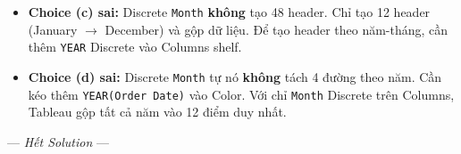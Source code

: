 \documentclass[12pt]{article}
\begin{document}
\begin{enumerate}[label=\textbf{Câu \arabic*.}, leftmargin=*, labelsep=1em, itemsep=2em]
\begin{guidelinebox}
\begin{itemize}
    \item \textbf{Choice (c) sai:} Discrete \texttt{Month} \textbf{không} tạo 48 header. Chỉ tạo 12 header (January $\rightarrow$ December) và gộp dữ liệu. Để tạo header theo năm-tháng, cần thêm \texttt{YEAR} Discrete vào Columns shelf.

    \item \textbf{Choice (d) sai:} Discrete \texttt{Month} tự nó \textbf{không} tách 4 đường theo năm. Cần kéo thêm \texttt{YEAR(Order Date)} vào Color. Với chỉ \texttt{Month} Discrete trên Columns, Tableau gộp tất cả năm vào 12 điểm duy nhất.
\end{itemize}

\end{guidelinebox}

\end{enumerate}

\vspace{2em}
\begin{center}
--- \textit{Hết Solution} ---
\end{center}
\end{document}
